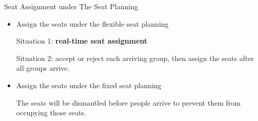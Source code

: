 \begin{frame}{Seat Assignment under The Seat Planning}
    \vspace{0.2cm}
    \begin{itemize}
    \item Assign the seats under the {\color{red}flexible seat planning} 
    \vspace{0.2cm}

      Situation 1: {\color{red} \textbf{real-time seat assignment}}
      \vspace{0.2cm}

      Situation 2: accept or reject each arriving group, then assign the seats after all groups arrive.
    \vspace{0.2cm}

    \item Assign the seats under the {\color{red}fixed seat planning}
    \vspace{0.2cm}
    
    The seats will be dismantled before people arrive to prevent them from occupying those seats. 
    \end{itemize}
\end{frame}





